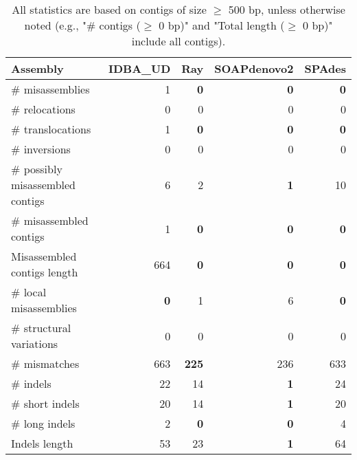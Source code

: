 \documentclass[12pt,a4paper]{article}
\begin{document}
\begin{table}[ht]
\begin{center}
\caption{All statistics are based on contigs of size $\geq$ 500 bp, unless otherwise noted (e.g., "\# contigs ($\geq$ 0 bp)" and "Total length ($\geq$ 0 bp)" include all contigs).}
\begin{tabular}{|l*{4}{|r}|}
\hline
Assembly & IDBA\_UD & Ray & SOAPdenovo2 & SPAdes \\ \hline
\# misassemblies & 1 & {\bf 0} & {\bf 0} & {\bf 0} \\ \hline
\hspace{5mm}\# relocations & 0 & 0 & 0 & 0 \\ \hline
\hspace{5mm}\# translocations & 1 & {\bf 0} & {\bf 0} & {\bf 0} \\ \hline
\hspace{5mm}\# inversions & 0 & 0 & 0 & 0 \\ \hline
\# possibly misassembled contigs & 6 & 2 & {\bf 1} & 10 \\ \hline
\# misassembled contigs & 1 & {\bf 0} & {\bf 0} & {\bf 0} \\ \hline
Misassembled contigs length & 664 & {\bf 0} & {\bf 0} & {\bf 0} \\ \hline
\# local misassemblies & {\bf 0} & 1 & 6 & {\bf 0} \\ \hline
\# structural variations & 0 & 0 & 0 & 0 \\ \hline
\# mismatches & 663 & {\bf 225} & 236 & 633 \\ \hline
\# indels & 22 & 14 & {\bf 1} & 24 \\ \hline
\hspace{5mm}\# short indels & 20 & 14 & {\bf 1} & 20 \\ \hline
\hspace{5mm}\# long indels & 2 & {\bf 0} & {\bf 0} & 4 \\ \hline
Indels length & 53 & 23 & {\bf 1} & 64 \\ \hline
\end{tabular}
\end{center}
\end{table}
\end{document}
